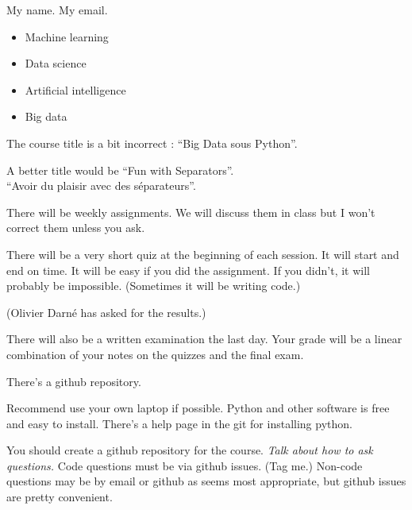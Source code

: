 




My name.  My email.

\begin{itemize}
\item Machine learning
\item Data science
\item Artificial intelligence
\item Big data
\end{itemize}

The course title is a bit incorrect : ``Big Data sous Python''.

A better title would be ``Fun with Separators''.\\
``Avoir du plaisir avec des séparateurs''.

There will be weekly assignments.  We will discuss them in class but I
won't correct them unless you ask.

There will be a very short quiz at the beginning of each session.  It
will start and end on time.  It will be easy if you did the
assignment.  If you didn't, it will probably be impossible.
(Sometimes it will be writing code.)

(Olivier Darné has asked for the results.)

There will also be a written examination the last day.  Your grade
will be a linear combination of your notes on the quizzes and the
final exam.

\bigskip

There's a github repository.

Recommend use your own laptop if possible.  Python and other software
is free and easy to install.  There's a help page in the git for
installing python.

You should create a github repository for the course.  \textit{Talk
  about how to ask questions.}  Code questions must be via github
issues.  (Tag me.)  Non-code questions may be by email or github as
seems most appropriate, but github issues are pretty convenient.


